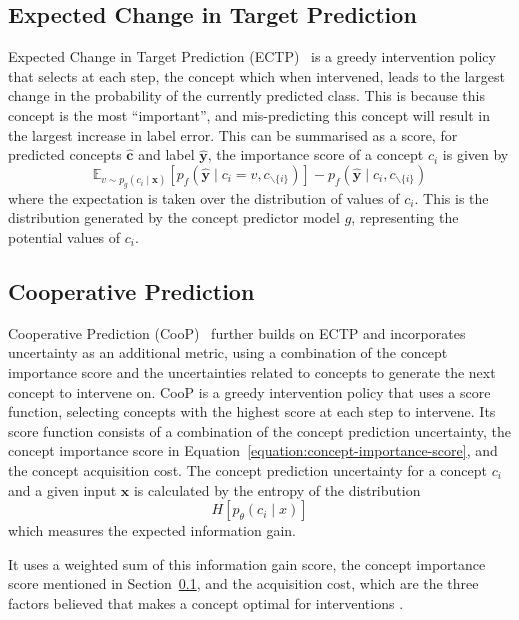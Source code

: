 \subsection{Expected Change in Target Prediction}\label{background:ectp}
Expected Change in Target Prediction (ECTP)~\cite{ectp} is a greedy 
intervention policy that selects at each step, the concept which 
when intervened, leads to the largest change in the probability
of the currently predicted class. This is because this concept
is the most ``important'', and mis-predicting this concept
will result in the largest increase in label error. This can be 
summarised as a score, for predicted concepts $\hat{\mathbf{c}}$ and label
 $\hat{\mathbf{y}}$, the importance score of a concept $c_i$ is given by
\begin{equation}\label{equation:concept-importance-score}
\mathbb{E}_{v \sim p_g(c_i \mid \mathbf{x})} 
[p_f(\hat{\mathbf{y}} \mid c_i = v, c_{\backslash\{i\}})] - p_f(\hat{\mathbf{y}} \mid c_i, c_{\backslash\{i\}})
\end{equation}
where the expectation is taken over the distribution of values of $c_i$.
This is the distribution
generated by the concept predictor model
$g$, representing the potential values of $c_i$.

\subsection{Cooperative Prediction}\label{background:coop}
Cooperative Prediction (CooP)~\cite{coop} 
further builds on ECTP and incorporates
uncertainty as an additional metric, using a combination of the concept importance
score and the uncertainties related to concepts to generate the next concept to intervene on.
CooP is a greedy intervention policy that 
uses a score function,
selecting concepts with the highest score at each step
to intervene.
Its score function consists of a combination of the concept prediction
uncertainty, the concept importance score in Equation~\ref{equation:concept-importance-score}, and the concept acquisition cost.
The concept prediction uncertainty for a concept $c_i$
and a given input $\mathbf{x}$ is calculated by the entropy
of the distribution
\[H [p_\theta(c_i \mid x)] \]
which measures the expected information gain.

It uses a weighted sum of this information gain score,
the concept importance score mentioned in Section~\ref{background:ectp},
and the acquisition cost, which are the three factors believed that 
makes a concept optimal for interventions
.


